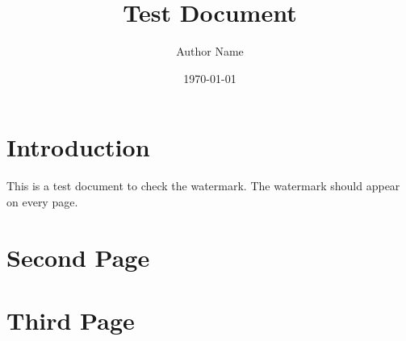 \documentclass{article}
\begin{document}
\title{Test Document}
\author{Author Name}
\date{\today}
\maketitle

\section{Introduction}
This is a test document to check the watermark. The watermark should appear on every page.

\newpage
\section{Second Page}
\lipsum[1-5] %

\newpage
\section{Third Page}
\lipsum[6-10] %
\end{document}
